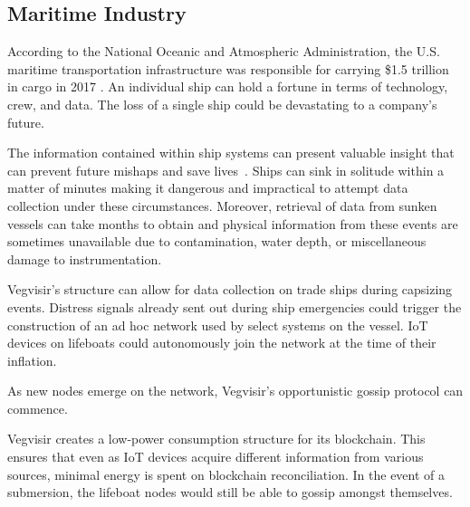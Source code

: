 \documentclass[conference, letterpaper]{IEEEtran}
\begin{document}
\subsection{Maritime Industry}

According to the National Oceanic and Atmospheric Administration, the U.S. maritime transportation infrastructure was responsible for carrying  \$1.5 trillion in cargo in 2017 \cite{us_department_of_commerce}. An individual ship can hold a fortune in terms of technology, crew, and data.  The loss of a single ship could be devastating to a company's future. 

The information contained within ship systems can present valuable insight that can prevent future mishaps and save lives~\cite{howgego2018peril}. Ships can sink in solitude within a matter of minutes making it dangerous and impractical to attempt data collection under these circumstances. Moreover, retrieval of data from sunken vessels can take months to obtain and physical information from these events are sometimes unavailable due to contamination, water depth, or miscellaneous damage to instrumentation. 

Vegvisir's structure can allow for data collection on trade ships during capsizing events. Distress signals already sent out during ship emergencies could trigger the construction of an ad hoc network used by select systems on the vessel. IoT devices on lifeboats could autonomously join the network at the time of their inflation.

As new nodes emerge on the network, Vegvisir's opportunistic gossip protocol can commence.

Vegvisir creates a low-power consumption structure for its blockchain. This ensures that even as IoT devices acquire different information from various sources, minimal energy is spent on blockchain reconciliation. In the event of a submersion, the lifeboat nodes would still be able to gossip amongst themselves.
\end{document}
